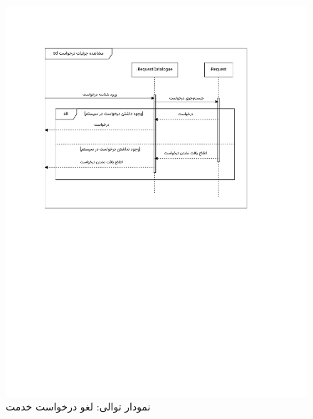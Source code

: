 \begin{figure}[ht!]
	\centering
	\includegraphics[scale=0.8, page=6]{figs/OOD-Sequence-2.pdf}
	\caption{نمودار توالی: لغو درخواست خدمت}
\end{figure}
\FloatBarrier
\newpage

